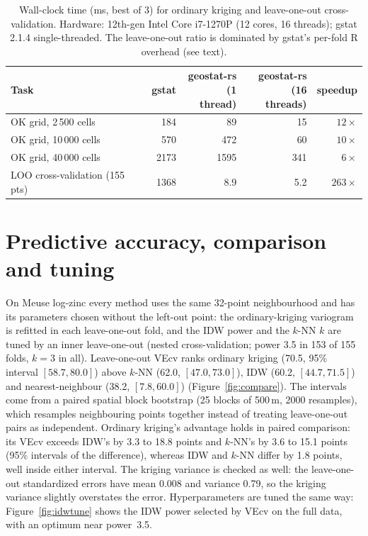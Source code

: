 \documentclass[preprint,12pt,authoryear]{elsarticle}
\begin{document}
\begin{table}[t]
\centering
\caption{Wall-clock time (ms, best of 3) for ordinary kriging and
leave-one-out cross-validation. Hardware: 12th-gen Intel Core i7-1270P
(12 cores, 16 threads); gstat 2.1.4 single-threaded. The leave-one-out
ratio is dominated by gstat's per-fold R overhead (see text).}
\label{tab:bench}
\begin{tabular}{@{}lrrrr@{}}
\toprule
Task & gstat & \shortstack[r]{geostat-rs\\(1 thread)} &
\shortstack[r]{geostat-rs\\(16 threads)} & speedup \\
\midrule
OK grid, 2\,500 cells   & 184  & 89   & 15  & $12\times$ \\
OK grid, 10\,000 cells  & 570  & 472  & 60  & $10\times$ \\
OK grid, 40\,000 cells  & 2173 & 1595 & 341 & $6\times$ \\
LOO cross-validation (155 pts) & 1368 & 8.9 & 5.2 & $263\times$ \\
\bottomrule
\end{tabular}
\end{table}

\section{Predictive accuracy, comparison and tuning}
\label{sec:accuracy}

On Meuse log-zinc every method uses the same 32-point neighbourhood and has its
parameters chosen without the left-out point: the ordinary-kriging variogram is
refitted in each leave-one-out fold, and the IDW power and the $k$-NN $k$ are
tuned by an inner leave-one-out (nested cross-validation; power 3.5 in 153 of
155 folds, $k=3$ in all). Leave-one-out VEcv ranks ordinary kriging (70.5, 95\%
interval $[58.7, 80.0]$) above $k$-NN (62.0, $[47.0, 73.0]$), IDW (60.2,
$[44.7, 71.5]$) and nearest-neighbour (38.2, $[7.8, 60.0]$)
(Figure~\ref{fig:compare}). The intervals come from a paired spatial block
bootstrap (25 blocks of 500\,m, 2000 resamples), which resamples neighbouring
points together instead of treating leave-one-out pairs as independent. Ordinary
kriging's advantage holds in paired comparison: its VEcv exceeds IDW's by 3.3 to
18.8 points and $k$-NN's by 3.6 to 15.1 points (95\% intervals of the
difference), whereas IDW and $k$-NN differ by 1.8 points, well inside either
interval. The kriging variance is checked as well: the leave-one-out
standardized errors have mean 0.008 and variance 0.79, so the kriging variance
slightly overstates the error. Hyperparameters are tuned the same way:
Figure~\ref{fig:idwtune} shows the IDW power selected by VEcv on the full data,
with an optimum near power~3.5.
\end{document}

